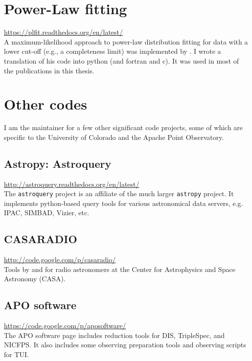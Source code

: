 \section{Power-Law fitting}
\url{https://plfit.readthedocs.org/en/latest/}\\
A maximum-likelihood approach to power-law distribution fitting for data with a
lower cut-off (e.g., a completeness limit) was implemented by
\citet{Clauset2007}.  I wrote a translation of his code into python (and
fortran and c).  It was used in most of the publications in this thesis.

\section{Other codes}
I am the maintainer for a few other significant code projects, some of which
are specific to the University of Colorado and the Apache Point Observatory.

\subsection{Astropy: Astroquery}
\url{http://astroquery.readthedocs.org/en/latest/}\\
The \texttt{astroquery} project is an affiliate of the much larger
\texttt{astropy} project.  It implements python-based query tools
for various astronomical data servers, e.g. IPAC, SIMBAD, Vizier, etc.

\subsection{CASARADIO}
\url{http://code.google.com/p/casaradio/}\\
Tools by and for radio astronomers at the Center for Astrophysics and Space
Astronomy (CASA).

\subsection{APO software}
\url{https://code.google.com/p/aposoftware/}\\
The APO software page includes reduction tools for DIS, TripleSpec, and NICFPS.
It also includes some observing preparation tools and observing scripts for
TUI.




